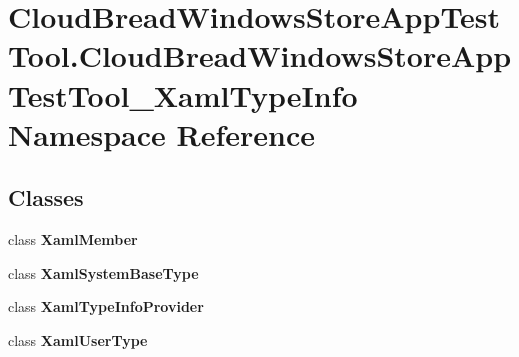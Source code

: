 \hypertarget{a00438}{}\section{Cloud\+Bread\+Windows\+Store\+App\+Test\+Tool.\+Cloud\+Bread\+Windows\+Store\+App\+Test\+Tool\+\_\+\+Xaml\+Type\+Info Namespace Reference}
\label{a00438}
\subsection*{Classes}
\begin{DoxyCompactItemize}
\item 
class {\bfseries Xaml\+Member}
\item 
class {\bfseries Xaml\+System\+Base\+Type}
\item 
class {\bfseries Xaml\+Type\+Info\+Provider}
\item 
class {\bfseries Xaml\+User\+Type}
\end{DoxyCompactItemize}
